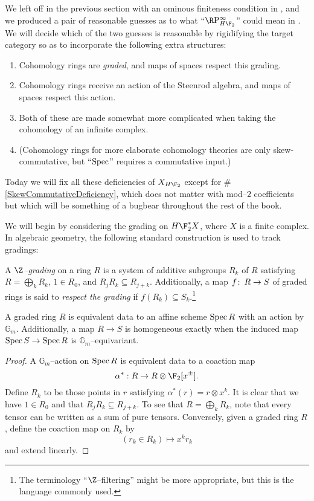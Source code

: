 We left off in the previous section with an ominous finiteness condition in , and we produced a pair of reasonable guesses as to what ``$\RP^\infty_{H\F_2}$'' could mean in .  We will decide which of the two guesses is reasonable by rigidifying the target category so as to incorporate the following extra structures:
\begin{enumerate}
\item Cohomology rings are \emph{graded}, and maps of spaces respect this grading.
\item Cohomology rings receive an action of the Steenrod algebra, and maps of spaces respect this action.
\item Both of these are made somewhat more complicated when taking the cohomology of an infinite complex.
\item \label{SkewCommutativeDeficiency} (Cohomology rings for more elaborate cohomology theories are only skew-commutative, but ``$\operatorname{Spec}$'' requires a commutative input.)
\end{enumerate}
Today we will fix all these deficiencies of $X_{H\F_2}$ except for \#\ref{SkewCommutativeDeficiency}, which does not matter with mod--$2$ coefficients but which will be something of a bugbear throughout the rest of the book.

We will begin by considering the grading on $H\F_2^* X$, where $X$ is a finite complex.  In algebraic geometry, the following standard construction is used to track gradings:

\begin{definition}
A \textit{$\Z$--grading} on a ring $R$ is a system of additive subgroups $R_k$ of $R$ satisfying $R = \bigoplus_k R_k$, $1 \in R_0$, and $R_j R_k \subseteq R_{j+k}$.  Additionally, a map $f\colon\thinspace R \to S$ of graded rings is said to \textit{respect the grading} if $f(R_k) \subseteq S_k$.\footnote{The terminology ``$\Z$--filtering'' might be more appropriate, but this is the language commonly used.}
\end{definition}

\begin{lemma}\label{GradedAndGmEquivAgree}
A graded ring $R$ is equivalent data to an affine scheme $\operatorname{Spec} R$ with an action by $\mathbb G_m$.  Additionally, a map $R \to S$ is homogeneous exactly when the induced map $\operatorname{Spec} S \to \operatorname{Spec} R$ is $\mathbb G_m$--equivariant.
\end{lemma}
\begin{proof}
A $\mathbb G_m$--action on $\operatorname{Spec} R$ is equivalent data to a coaction map \[\alpha^*: R \to R \otimes \F_2[x^\pm].\]  Define $R_k$ to be those points in $r$ satisfying $\alpha^*(r) = r \otimes x^k$.  It is clear that we have $1 \in R_0$ and that $R_j R_k \subseteq R_{j+k}$.  To see that $R = \bigoplus_k R_k$, note that every tensor can be written as a sum of pure tensors.  Conversely, given a graded ring $R$, define the coaction map on $R_k$ by \[(r_k \in R_k) \mapsto x^k r_k\] and extend linearly.
\end{proof}


